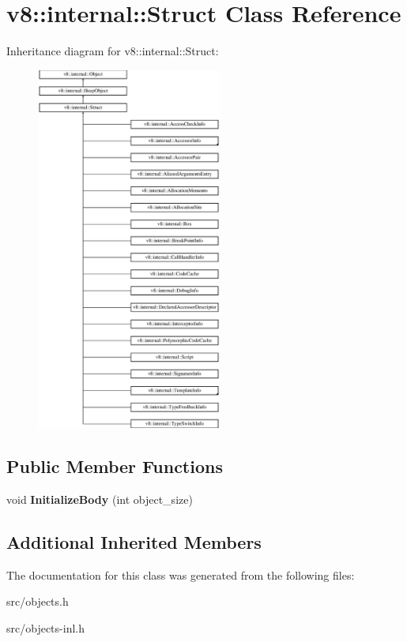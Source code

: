 \hypertarget{classv8_1_1internal_1_1_struct}{}\section{v8\+:\+:internal\+:\+:Struct Class Reference}
\label{classv8_1_1internal_1_1_struct}
Inheritance diagram for v8\+:\+:internal\+:\+:Struct\+:\begin{figure}[H]
\begin{center}
\leavevmode
\includegraphics[height=12.000000cm]{classv8_1_1internal_1_1_struct}
\end{center}
\end{figure}
\subsection*{Public Member Functions}
\begin{DoxyCompactItemize}
\item 
\hypertarget{classv8_1_1internal_1_1_struct_a301776b4c2188645d8f6bec5093dd85d}{}void {\bfseries Initialize\+Body} (int object\+\_\+size)\label{classv8_1_1internal_1_1_struct_a301776b4c2188645d8f6bec5093dd85d}

\end{DoxyCompactItemize}
\subsection*{Additional Inherited Members}


The documentation for this class was generated from the following files\+:\begin{DoxyCompactItemize}
\item 
src/objects.\+h\item 
src/objects-\/inl.\+h\end{DoxyCompactItemize}
